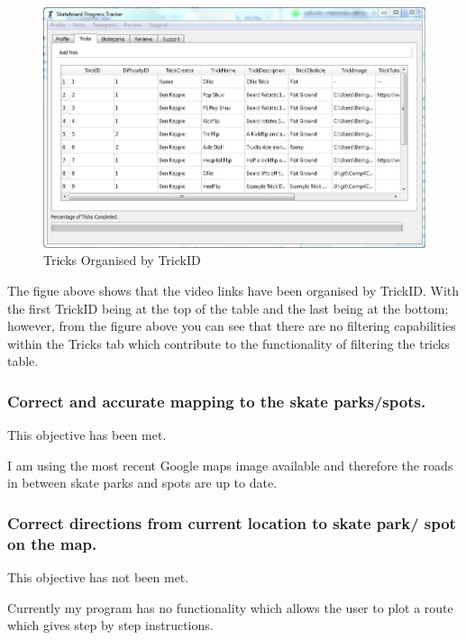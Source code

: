 \begin{figure}[H]
    \includegraphics[width=\textwidth]{./Evaluation/images/OrganisedTricks.jpg}
    \caption{Tricks Organised by TrickID} \label{fig:TricksOrganised}
\end{figure}

The figue above shows that the video links have been organised by TrickID. With the first TrickID being at the top of the table and the last being at the bottom; however, from the figure above you can see that there are no filtering capabilities within the Tricks tab which contribute to the functionality of filtering the tricks table.




\subsubsection{Correct and accurate mapping to the skate parks/spots.}

This objective has been met.

I am using the most recent Google maps image available and therefore the roads in between skate parks and spots are up to date.



\subsubsection {Correct directions from current location to skate park/ spot on the map.}

This objective has not been met.

Currently my program has no functionality which allows the user to plot a route which gives step by step instructions.




